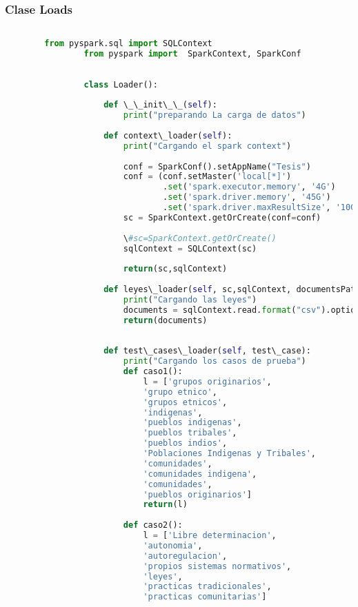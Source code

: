 \documentclass[12pt]{article}
\begin{document}
		\subsubsection*{ Clase Loads}
		\begin{lstlisting}[language=Python, caption= Clase loads]
		
		from pyspark.sql import SQLContext
				from pyspark import  SparkContext, SparkConf
				
				
				class Loader():
				    
				    def \_\_init\_\_(self):
				        print("preparando La carga de datos")
				        
				    def context\_loader(self):
				        print("Cargando el spark context")
				        
				        conf = SparkConf().setAppName("Tesis")
				        conf = (conf.setMaster('local[*]')
				                .set('spark.executor.memory', '4G')
				                .set('spark.driver.memory', '45G')
				                .set('spark.driver.maxResultSize', '10G'))
				        sc = SparkContext.getOrCreate(conf=conf)
				        
				        \#sc=SparkContext.getOrCreate()
				        sqlContext = SQLContext(sc)
				        
				        return(sc,sqlContext)
				    
				    def leyes\_loader(self, sc,sqlContext, documentsPath):
				        print("Cargando las leyes")
				        documents = sqlContext.read.format("csv").option("header", "true").load(documentsPath)
				        return(documents)
				
				    
				    def test\_cases\_loader(self, test\_case):
				        print("Cargando los casos de prueba")
				        def caso1():
				            l = ['grupos originarios',
				            'grupo etnico',
				            'grupos etnicos',
				            'indigenas',
				            'pueblos indigenas',
				            'pueblos tribales',
				            'pueblos indios',
				            'Poblaciones Indigenas y Tribales',
				            'comunidades',
				            'comunidades indigena',
				            'comunidades',
				            'pueblos originarios']
				            return(l)
				
				        def caso2():
				            l = ['Libre determinacion',
				            'autonomia',
				            'autoregulacion',
				            'propios sistemas normativos',
				            'leyes',
				            'practicas tradicionales',
				            'practicas comunitarias']
				

\end{lstlisting}
\end{document}
